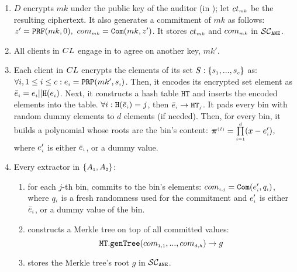 \begin{enumerate}[leftmargin=4mm]
%
\item\label{e-psi::commit-to-mk} $D$ encrypts $mk$ under the public key of the auditor (in \SCpc); let $ct_{\scriptscriptstyle mk}$ be the resulting ciphertext.  It also generates a commitment of $mk$ as follows: $z'=\mathtt{PRF}(mk, 0),\ com_{\scriptscriptstyle mk}=\mathtt{Com}(mk, z')$. It stores $ct_{\scriptscriptstyle mk}$  and ${com}_{\scriptscriptstyle mk}$ in $\mathcal{SC}_{\mathtt{ANE}}$. 


\item\label{e-psi::gen-mk-prime} All clients in ${CL}$ engage in \ct to agree on another key, $mk'$.
%
\item\label{Smart-PSI:encode-elem} Each client  in ${CL}$ encrypts the elements of its set $S:\{ s_{\scriptscriptstyle 1},..., s_{\scriptscriptstyle c}\}$ as: $\forall i, 1\leq i\leq c: e_{\scriptscriptstyle i}=\mathtt{PRP}(mk', s_{\scriptscriptstyle i})$. 
%
Then, it encodes its encrypted set element as $\bar{e}_{\scriptscriptstyle i} =e_{\scriptscriptstyle i} || \mathtt{H}(e_{\scriptscriptstyle i})$.  
%
Next, it constructs a hash table  $\mathtt{HT}$ and inserts the encoded elements into the table. $\forall i: \mathtt{H}( \bar{e}_{\scriptscriptstyle i})={ {  {j}}}$, then $\bar{e}_{\scriptscriptstyle i}\rightarrow \mathtt{HT}_{\scriptscriptstyle {  {j}}}$. It pads every bin with random dummy elements to $d$ elements (if needed). Then,  for every bin, it builds a polynomial whose roots are the bin's content: $\bm\pi^{\scriptscriptstyle { {(I)}}}=\prod\limits^{\scriptscriptstyle d}_{\scriptscriptstyle i=1} (x-e'_{\scriptscriptstyle i})$, where $e'_{\scriptscriptstyle i}$ is either $\bar{e}_{\scriptscriptstyle i}$, or a dummy value. 




\item\label{merkel-tree-cons} Every extractor in $\{A_{\scriptscriptstyle 1}, A_{\scriptscriptstyle 2}\}$: 

\begin{enumerate}
%
%
\item\label{smart-PSI::commit-to-bin} for each $j$-th bin, commits to the bin's elements: $com_{\scriptscriptstyle{i,j}}=\mathtt{Com}(e'_{\scriptscriptstyle i}, q_{\scriptscriptstyle i})$, where $q_{\scriptscriptstyle i}$ is a fresh randomness  used for the commitment and $e'_{\scriptscriptstyle i}$ is either $\bar{e}_{\scriptscriptstyle i}$, or a dummy value of the bin. %




\item  constructs a Merkle tree on top of all committed values: 
\vspace{-.1mm}
$$\mathtt{MT.genTree}(com_{\scriptscriptstyle 1,1},...,com_{\scriptscriptstyle d,h})\rightarrow g$$ %
\item stores the Merkle tree's root $g$ in $\mathcal{SC}_{\mathtt{ANE}}$.
\end{enumerate}



\end{enumerate}
